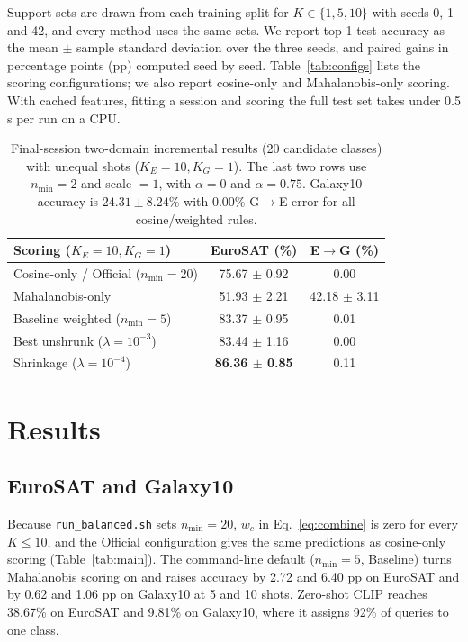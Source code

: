\documentclass[letterpaper]{article} %
\newcommand{\nmin}{n_{\min}}
\begin{document}
Support sets are drawn from each training split for $K \in \{1, 5, 10\}$ with seeds 0, 1 and 42, and every method uses the same sets. We report top-1 test accuracy as the mean $\pm$ sample standard deviation over the three seeds, and paired gains in percentage points (pp) computed seed by seed. Table~\ref{tab:configs} lists the scoring configurations; we also report cosine-only and Mahalanobis-only scoring. With cached features, fitting a session and scoring the full test set takes under 0.5 s per run on a CPU.

\begin{table}[t]
\centering
\footnotesize
\setlength{\tabcolsep}{3pt}
\begin{tabular}{@{}lcc@{}}
\toprule
Scoring ($K_E{=}10, K_G{=}1$) & EuroSAT (\%) & E$\to$G (\%) \\
\midrule
Cosine-only / Official ($\nmin{=}20$) & 75.67 $\pm$ 0.92 & 0.00 \\
Mahalanobis-only & 51.93 $\pm$ 2.21 & 42.18 $\pm$ 3.11 \\
Baseline weighted ($\nmin{=}5$) & 83.37 $\pm$ 0.95 & 0.01 \\
Best unshrunk ($\lambda{=}10^{-3}$) & 83.44 $\pm$ 1.16 & 0.00 \\
Shrinkage ($\lambda{=}10^{-4}$) & \textbf{86.36 $\pm$ 0.85} & 0.11 \\
\bottomrule
\end{tabular}
\caption{Final-session two-domain incremental results (20 candidate classes) with unequal shots ($K_E = 10, K_G = 1$). The last two rows use $\nmin = 2$ and scale $= 1$, with $\alpha = 0$ and $\alpha = 0.75$. Galaxy10 accuracy is $24.31 \pm 8.24\%$ with $0.00\%$ G$\to$E error for all cosine/weighted rules.}
\label{tab:cross}
\end{table}

\section{Results}

\subsection{EuroSAT and Galaxy10}

Because \texttt{run\_balanced.sh} sets $\nmin = 20$, $w_c$ in Eq.~\eqref{eq:combine} is zero for every $K \le 10$, and the Official configuration gives the same predictions as cosine-only scoring (Table~\ref{tab:main}). The command-line default ($\nmin = 5$, Baseline) turns Mahalanobis scoring on and raises accuracy by 2.72 and 6.40 pp on EuroSAT and by 0.62 and 1.06 pp on Galaxy10 at 5 and 10 shots. Zero-shot CLIP reaches 38.67\% on EuroSAT and 9.81\% on Galaxy10, where it assigns 92\% of queries to one class.
\end{document}
